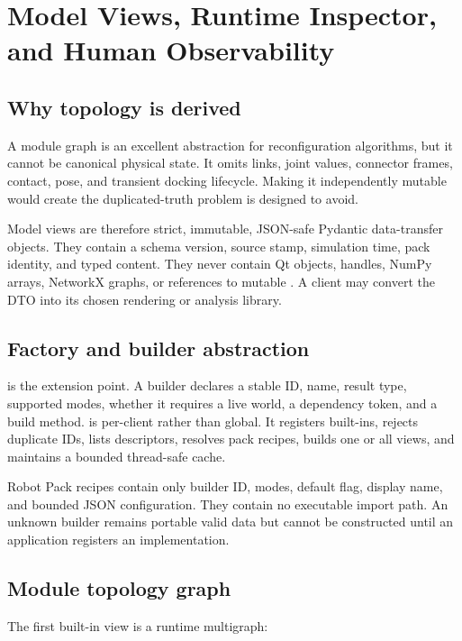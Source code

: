 \section{Model Views, Runtime Inspector, and Human Observability}
\label{sec:views}

\subsection{Why topology is derived}

A module graph is an excellent abstraction for reconfiguration algorithms, but it
cannot be canonical physical state. It omits links, joint values, connector frames,
contact, pose, and transient docking lifecycle. Making it independently mutable would
create the duplicated-truth problem \modsim{} is designed to avoid.

Model views are therefore strict, immutable, JSON-safe Pydantic data-transfer objects.
They contain a schema version, source stamp, simulation time, pack identity, and typed
content. They never contain Qt objects, \mujoco{} handles, NumPy arrays, NetworkX
graphs, or references to mutable . A client may convert the DTO into
its chosen rendering or analysis library.

\subsection{Factory and builder abstraction}

 is the extension point. A builder declares a stable ID, name,
result type, supported modes, whether it requires a live world, a dependency token,
and a build method.  is per-client rather than global. It
registers built-ins, rejects duplicate IDs, lists descriptors, resolves pack recipes,
builds one or all views, and maintains a bounded thread-safe cache.

Robot Pack recipes contain only builder ID, modes, default flag, display name, and
bounded JSON configuration. They contain no executable import path. An unknown builder
remains portable valid data but cannot be constructed until an application registers an
implementation.

\subsection{Module topology graph}

The first built-in view is a runtime multigraph:

